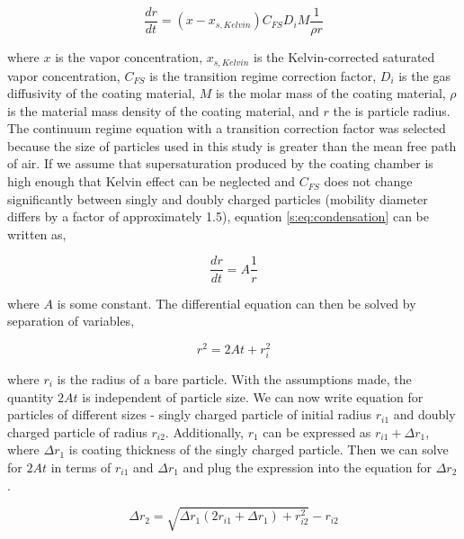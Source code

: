 \documentclass[12pt]{article}
\begin{document}
\begin{equation}
    \frac{dr}{dt}=\left(x-x_{s,Kelvin}\right)C_{FS}D_iM\frac{1}{\rho r}
    \label{s:eq:condensation}
\end{equation}

\noindent where $x$ is the vapor concentration, $x_{s,Kelvin}$ is the Kelvin-corrected saturated vapor concentration, $C_{FS}$ is the transition regime correction factor, $D_i$ is the gas diffusivity of the coating material, $M$ is the molar mass of the coating material, $\rho$ is the material mass density of the coating material, and $r$ the is particle radius. The continuum regime equation with a transition correction factor was selected because the size of particles used in this study is greater than the mean free path of air. If we assume that supersaturation produced by the coating chamber is high enough that Kelvin effect can be neglected and $C_{FS}$ does not change significantly between singly and doubly charged particles (mobility diameter differs by a factor of approximately 1.5), equation \ref{s:eq:condensation} can be written as,

\begin{equation}
    \frac{dr}{dt}=A\frac{1}{r}
\end{equation}

\noindent where $A$ is some constant. The differential equation can then be solved by separation of variables,

\begin{equation}
    r^2=2At+r_i^2
\end{equation}

\noindent where $r_i$ is the radius of a bare particle. With the assumptions made, the quantity $2At$ is independent of particle size. We can now write equation for particles of different sizes - singly charged particle of initial radius $r_{i1}$ and doubly charged particle of radius $r_{i2}$. Additionally, $r_1$ can be expressed as $r_{i1}+\Delta r_1$, where $\Delta r_1$ is coating thickness of the singly charged particle. Then we can solve for $2At$ in terms of $r_{i1}$ and $\Delta r_1$ and plug the expression into the equation for $\Delta r_2$.

\begin{equation}
    \Delta r_2=\sqrt{\Delta r_1\left(2r_{i1}+\Delta r_1\right)+r_{i2}^2}-r_{i2}
    \label{s:eq:thickness}
\end{equation}
\end{document}
